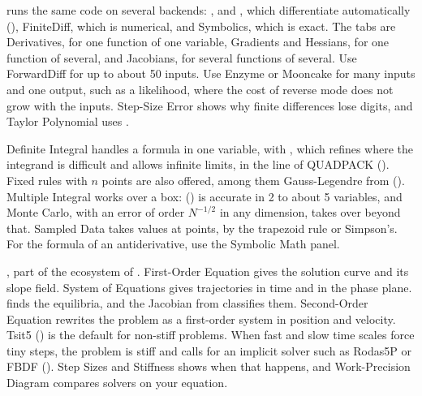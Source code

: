  runs the same code on several backends: ,  and , which differentiate automatically (), FiniteDiff, which is numerical, and Symbolics, which is exact. The tabs are Derivatives, for one function of one variable, Gradients and Hessians, for one function of several, and Jacobians, for several functions of several. Use ForwardDiff for up to about 50 inputs. Use Enzyme or Mooncake for many inputs and one output, such as a likelihood, where the cost of reverse mode does not grow with the inputs. Step-Size Error shows why finite differences lose digits, and Taylor Polynomial uses .

Definite Integral handles a formula in one variable, with , which refines where the integrand is difficult and allows infinite limits, in the line of QUADPACK (). Fixed rules with $n$ points are also offered, among them Gauss-Legendre from  (). Multiple Integral works over a box:  () is accurate in 2 to about 5 variables, and Monte Carlo, with an error of order $N^{-1/2}$ in any dimension, takes over beyond that. Sampled Data takes values at points, by the trapezoid rule or Simpson's. For the formula of an antiderivative, use the Symbolic Math panel.

, part of the ecosystem of . First-Order Equation gives the solution curve and its slope field. System of Equations gives trajectories in time and in the phase plane.  finds the equilibria, and the Jacobian from  classifies them. Second-Order Equation rewrites the problem as a first-order system in position and velocity. Tsit5 () is the default for non-stiff problems. When fast and slow time scales force tiny steps, the problem is stiff and calls for an implicit solver such as Rodas5P or FBDF (). Step Sizes and Stiffness shows when that happens, and Work-Precision Diagram compares solvers on your equation.

